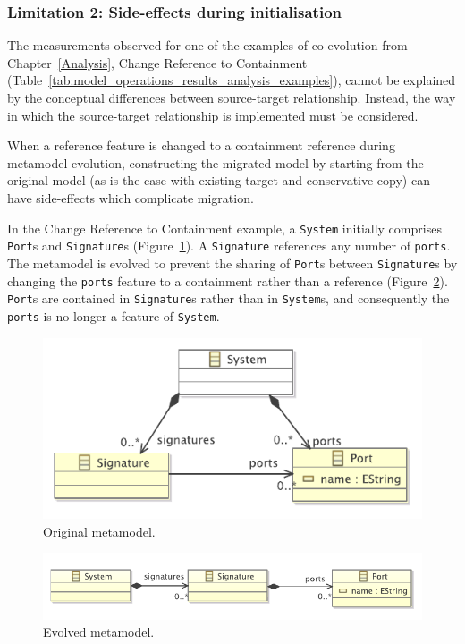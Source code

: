 \subsubsection{Limitation 2: Side-effects during initialisation}
The measurements observed for one of the examples of co-evolution from Chapter~\ref{Analysis}, Change Reference to Containment (Table~\ref{tab:model_operations_results_analysis_examples}), cannot be explained by the conceptual differences between source-target relationship. Instead, the way in which the source-target relationship is implemented must be considered.

When a reference feature is changed to a containment reference during metamodel evolution, constructing the migrated model by starting from the original model (as is the case with existing-target and conservative copy) can have side-effects which complicate migration.

In the Change Reference to Containment example, a \texttt{System} initially comprises \texttt{Port}s and \texttt{Signature}s (Figure~\ref{fig:ref2cont_original_mm}). A \texttt{Signature} references any number of \texttt{ports}. The metamodel is evolved to prevent the sharing of \texttt{Port}s between \texttt{Signature}s by changing the \texttt{ports} feature to a containment rather than a reference (Figure~\ref{fig:ref2cont_evolved_mm}). \texttt{Port}s are contained in \texttt{Signature}s rather than in \texttt{System}s, and consequently the \texttt{ports} is no longer a feature of \texttt{System}.

\begin{figure}[htbp]
  \centering
  \includegraphics[scale=0.75]{6.Evaluation/images/change_ref_to_cont_before.pdf}
  \caption{Original metamodel.}
  \label{fig:ref2cont_original_mm}
\end{figure}

\begin{figure}[htbp]
  \centering
  \includegraphics[scale=0.75]{6.Evaluation/images/change_ref_to_cont_after.pdf}
  \caption{Evolved metamodel.}
  \label{fig:ref2cont_evolved_mm}
\end{figure}

